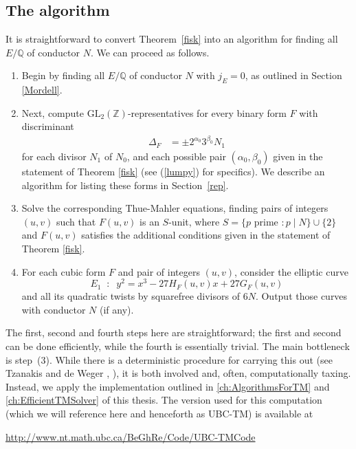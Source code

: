 \subsection{The algorithm}
It is straightforward to convert Theorem~\ref{fisk} into an algorithm for finding all $E/\mathbb{Q}$ of conductor $N$. We can proceed as follows.
\begin{enumerate}
\item Begin by finding all $E/\mathbb{Q}$ of conductor $N$ with $j_E=0$, as outlined in Section \ref{Mordell}.
\item Next, compute $\mbox{GL}_2(\mathbb{Z})$-representatives for every binary form $F$ with discriminant
\begin{align*}
\Delta_F &= \pm 2^{\alpha_0} 3^{\beta_0} N_1
\end{align*}
for each divisor $N_1$ of $N_0$, and each possible pair $(\alpha_0,\beta_0)$ given in the statement of Theorem 
\ref{fisk} (see (\ref{lumpy}) for specifics). We describe an algorithm for listing these forms in Section~\ref{rep}. 
\item Solve the corresponding Thue-Mahler equations, finding pairs of integers $(u,v)$ such that
$F(u,v)$ is an $S$-unit, where $S = \{ p \mbox{ prime } : p \mid N \} \cup \{2 \}$ and $F(u,v)$ satisfies the additional conditions given in the statement of Theorem 
\ref{fisk}.
\item For each cubic form $F$ and pair of integers $(u,v)$, consider the elliptic curve
$$
E_1 \; \; : \; \; y^2 = x^3 -27 H_F(u,v) x +27 G_F(u,v)
$$
and all its quadratic twists by squarefree divisors of $6N$. Output those curves with conductor $N$ (if any).
\end{enumerate}
The first, second and fourth steps here are straightforward; the first and second can be done efficiently, while the fourth is essentially 
trivial. The main bottleneck is step~(3). While there is a deterministic procedure for carrying this out (see Tzanakis and de 
Weger \cite{TW2}, \cite{TW3}), it is both involved and, often, computationally taxing. Instead, we apply the implementation outlined in \autoref{ch:AlgorithmsForTM} and \autoref{ch:EfficientTMSolver} of this thesis. The version used for this computation (which we will reference here and henceforth as UBC-TM) is available at 
\begin{center}
\url{http://www.nt.math.ubc.ca/BeGhRe/Code/UBC-TMCode}
\end{center}

